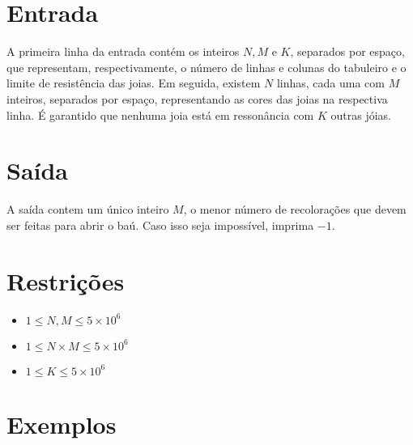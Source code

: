 \section*{Entrada}

A primeira linha da entrada contém os inteiros $N, M$ e $K$, separados por espaço, que representam, respectivamente, o número de linhas e colunas do tabuleiro e o limite de resistência das joias.
Em seguida, existem $N$ linhas, cada uma com $M$ inteiros, separados por espaço, representando as cores das joias na respectiva linha.
É garantido que nenhuma joia está em ressonância com $K$ outras jóias.

\section*{Saída}

A saída contem um único inteiro $M$, o menor número de recolorações que devem ser feitas para abrir o baú.
Caso isso seja impossível, imprima $-1$.

\section*{Restrições}

\begin{itemize}
\item $1 \leq N, M \leq 5 \times 10^6$
\item $1 \leq N \times M \leq 5 \times 10^6$
\item $1 \leq K \leq 5 \times 10^6$
\end{itemize}


\section*{Exemplos}

\exemplo
